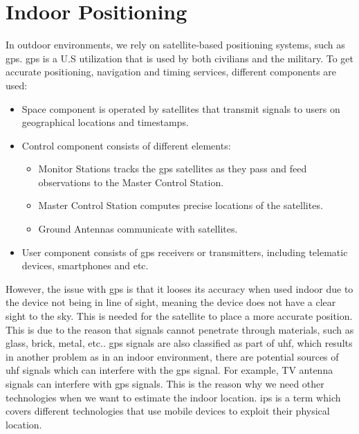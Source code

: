 \section{Indoor Positioning}
In outdoor environments, we rely on satellite-based positioning systems, such as \gls{gps}. \gls{gps} is a U.S utilization that is used by both civilians and the military. To get accurate positioning, navigation and timing services, different components are used: \cite{GPSofficial}

\begin{itemize}
    \item Space component is operated by satellites that transmit signals to users on geographical locations and timestamps. 
    \item Control component consists of different elements: 
    \begin{itemize}
        \item Monitor Stations tracks the \gls{gps} satellites as they pass and feed observations to the Master Control Station. 
        \item Master Control Station computes precise locations of the satellites.
        \item Ground Antennas communicate with satellites. 
    \end{itemize}
    \item User component consists of \gls{gps} receivers or transmitters, including telematic devices, smartphones and etc. 
\end{itemize}

However, the issue with \gls{gps} is that it looses its accuracy when used indoor due to the device not being in line of sight, meaning the device does not have a clear sight to the sky. This is needed for the satellite to place a more accurate position\cite{GPSofficial}. This is due to the reason that signals cannot penetrate through materials, such as glass, brick, metal, etc.\cite{GPSofficial}. \gls{gps} signals are also classified as part of \gls{uhf}, which results in another problem as in an indoor environment, there are potential sources of \gls{uhf} signals which can interfere with the \gls{gps} signal. For example, TV antenna signals can interfere with \gls{gps} signals\cite{GPSofficial}.
This is the reason why we need other technologies when we want to estimate the indoor location. \gls{ips} is a term which covers different technologies that use mobile devices to exploit their physical location. %

